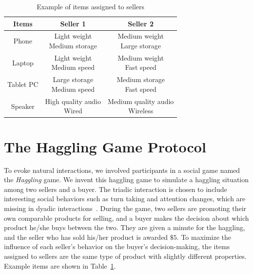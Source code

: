 \begin{table}[h]
	\centering
	
	\begin{tabular}{ c| c | c  }
		\hline	
		Items & Seller 1  &  Seller 2\\
		\hline	
		\hline	
		Phone &  \makecell{Light weight \\ Medium storage}    & \makecell{Medium weight\\ Large storage}\\
		\hline			
		Laptop &  \makecell{Light weight \\ Medium speed}    & \makecell{Medium weight\\ Fast speed}\\
		\hline			
		Tablet PC &  \makecell{Large storage\\ Medium speed}    & \makecell{Medium storage\\ Fast speed}\\
		\hline	
		Speaker &  \makecell{High quality audio\\ Wired}    & \makecell{Medium quality audio\\ Wireless}\\
		\hline	
	\end{tabular}
	\caption{Example of items assigned to sellers}
	\label{table:haggling_items}
\end{table}


\section{The Haggling Game Protocol}
To evoke natural interactions, we involved participants in a social game named the \emph{Haggling} game. We invent this haggling game to simulate a haggling situation among two sellers and a buyer. The triadic interaction is chosen to include interesting social behaviors such as turn taking and attention changes, which are missing in dyadic interactions~\cite{rehg2013decoding}. During the game, two sellers are promoting their own comparable products for selling, and a buyer makes the decision about which product he/she buys between the two. They are given a minute for the haggling, and the seller who has sold his/her product is awarded $\$5$. To maximize the influence of each seller's behavior on the buyer's decision-making, the items assigned to sellers are the same type of product with slightly different properties. Example items are shown in Table~\ref{table:haggling_items}. 

